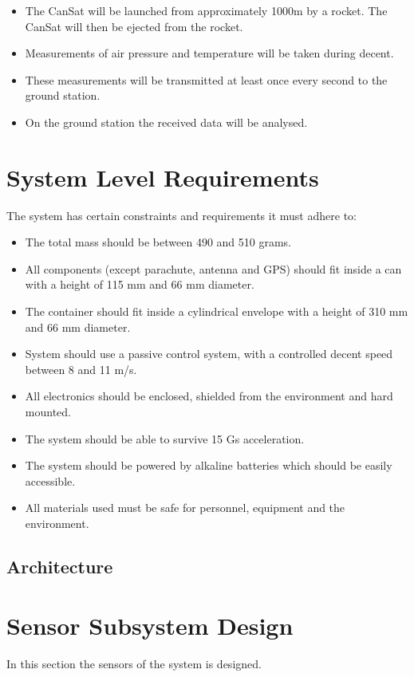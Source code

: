 \documentclass[10pt, a4paper]{article}
\begin{document}
\begin{itemize}
    \item The CanSat will be launched from approximately 1000m by a rocket.  The CanSat will then be ejected from the rocket.
    \item Measurements of air pressure and temperature will be taken during decent.
    \item These measurements will be transmitted at least once every second to the ground station.
    \item On the ground station the received data will be analysed.
\end{itemize}

\section{System Level Requirements}
The system has certain constraints and requirements it must adhere to:
\begin{itemize}
    \item The total mass should be between 490 and 510 grams.
    \item All components (except parachute, antenna and GPS) should fit inside a can with a height of 115 mm and 66 mm diameter.
    \item The container should fit inside a cylindrical envelope with a height of 310 mm and 66 mm diameter.
    \item System should use a passive control system, with a controlled decent speed between 8 and 11 m/s.
    \item All electronics should be enclosed, shielded from the environment and hard mounted.
    \item The system should be able to survive 15 Gs acceleration.
    \item The system should be powered by alkaline batteries which should be easily accessible.
    \item All materials used must be safe for personnel, equipment and the environment. 
\end{itemize}

\subsection{Architecture}

\newpage

\section{Sensor Subsystem Design}
In this section the sensors of the system is designed.
\end{document}
